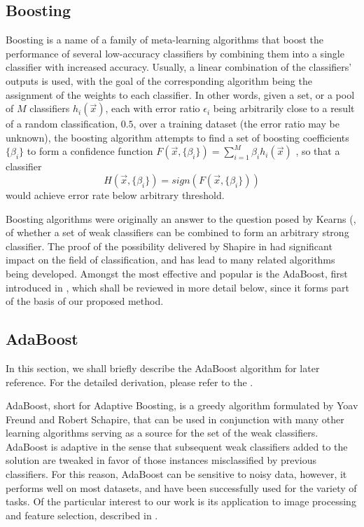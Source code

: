 \subsection{Boosting}
Boosting is a name of a family of meta-learning algorithms that boost the performance of several low-accuracy classifiers by combining them into a single classifier with increased accuracy. Usually, a linear combination of the classifiers' outputs is used, with the goal of the corresponding algorithm being the assignment of the  weights to each classifier. In other words, given a set, or a pool of $M$ classifiers $h_i(\vec{x})$, each with error ratio $\epsilon_i$ being arbitrarily close to a result of a random classification, $0.5$,  over a training dataset (the error ratio may be unknown), the boosting algorithm attempts to find a set of boosting coefficients $\{\beta_i\}$ to form a confidence function $F(\vec{x},\{\beta_i\})=\sum_{i=1}^{M}\beta_i h_i(\vec{x})$ , so that a classifier
\begin{equation}
\label{BoostingClassifier}
H(\vec{x},\{\beta_i\})=sign(F(\vec{x},\{\beta_i\}))
\end{equation}
would achieve error rate below arbitrary threshold.

Boosting algorithms were originally an answer to the question posed by Kearns (\cite{kearns}, of whether a set of weak classifiers can be combined to form an arbitrary strong classifier. The proof of the possibility delivered by Shapire in \cite{schap} had significant impact on the field of classification, and has lead to many related algorithms being developed. Amongst the most effective and popular is the AdaBoost, first introduced in \cite{adaor}, which shall be reviewed in more detail below, since it forms part of the basis of our proposed method.

\subsection{AdaBoost} 

In this section, we shall briefly describe the AdaBoost algorithm for later reference. For the detailed derivation, please refer to the \cite{adaor}.

AdaBoost, short for Adaptive Boosting, is a greedy algorithm formulated by Yoav Freund and Robert Schapire, that can be used in conjunction with many other learning algorithms serving as a source for the set of the weak classifiers. AdaBoost is adaptive in the sense that subsequent weak classifiers added to the solution are tweaked in favor of those instances misclassified by previous classifiers. For this reason,  AdaBoost can be sensitive to noisy data, however, it performs well on most datasets, and have been successfully used for the variety of tasks.  Of the particular interest to our work is its application to image processing and feature selection, described in \cite{OnlineBoost}. 


